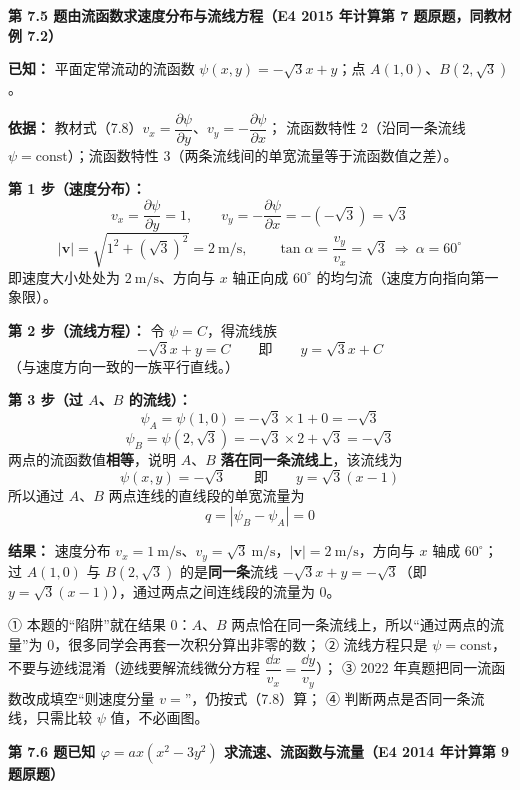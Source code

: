 \noindent\textbf{第 7.5 题\quad 由流函数求速度分布与流线方程（E4 2015 年计算第 7 题原题，同教材例 7.2）}

\begin{jie}
\textbf{已知：} 平面定常流动的流函数 $\psi(x,y)=-\sqrt{3}x+y$；点 $A(1,0)$、$B(2,\sqrt{3})$。

\textbf{依据：} 教材式（7.8）$v_x=\dfrac{\partial\psi}{\partial y}$、$v_y=-\dfrac{\partial\psi}{\partial x}$；
流函数特性 2（沿同一条流线 $\psi=\text{const}$）；流函数特性 3（两条流线间的单宽流量等于流函数值之差）。

\textbf{第 1 步（速度分布）：}
\[
v_x=\frac{\partial\psi}{\partial y}=1,\qquad v_y=-\frac{\partial\psi}{\partial x}=-(-\sqrt{3})=\sqrt{3}
\]
\[
|\bm v|=\sqrt{1^2+(\sqrt{3})^2}=2\ \mathrm{m/s},\qquad
\tan\alpha=\frac{v_y}{v_x}=\sqrt{3}\ \Longrightarrow\ \alpha=60^\circ
\]
即速度大小处处为 $2\ \mathrm{m/s}$、方向与 $x$ 轴正向成 $60^\circ$ 的均匀流（速度方向指向第一象限）。

\textbf{第 2 步（流线方程）：} 令 $\psi=C$，得流线族
\[
-\sqrt{3}x+y=C\qquad\text{即}\qquad y=\sqrt{3}x+C
\]
（与速度方向一致的一族平行直线。）

\textbf{第 3 步（过 $A$、$B$ 的流线）：}
\[
\psi_A=\psi(1,0)=-\sqrt{3}\times 1+0=-\sqrt{3}\]
\[
\psi_B=\psi(2,\sqrt{3})=-\sqrt{3}\times 2+\sqrt{3}=-\sqrt{3}
\]
两点的流函数值\textbf{相等}，说明 $A$、$B$ \textbf{落在同一条流线上}，该流线为
\[
\psi(x,y)=-\sqrt{3}\qquad\text{即}\qquad y=\sqrt{3}(x-1)
\]
所以通过 $A$、$B$ 两点连线的直线段的单宽流量为
\[
q=|\psi_B-\psi_A|=0
\]

\textbf{结果：} 速度分布 $v_x=1\ \mathrm{m/s}$、$v_y=\sqrt{3}\ \mathrm{m/s}$，$|\bm v|=2\ \mathrm{m/s}$，方向与 $x$ 轴成 $60^\circ$；
过 $A(1,0)$ 与 $B(2,\sqrt{3})$ 的是\textbf{同一条}流线 $-\sqrt{3}x+y=-\sqrt{3}$（即 $y=\sqrt{3}(x-1)$），通过两点之间连线段的流量为 $0$。
\end{jie}

\begin{yicuo}
① 本题的“陷阱”就在结果 0：$A$、$B$ 两点恰在同一条流线上，所以“通过两点的流量”为 0，很多同学会再套一次积分算出非零的数；
② 流线方程只是 $\psi=\text{const}$，不要与迹线混淆（迹线要解流线微分方程 $\dfrac{\dd x}{v_x}=\dfrac{\dd y}{v_y}$）；
③ 2022 年真题把同一流函数改成填空“则速度分量 $v=$”，仍按式（7.8）算；
④ 判断两点是否同一条流线，只需比较 $\psi$ 值，不必画图。
\end{yicuo}

\noindent\textbf{第 7.6 题\quad 已知 $\varphi=ax(x^2-3y^2)$ 求流速、流函数与流量（E4 2014 年计算第 9 题原题）}

